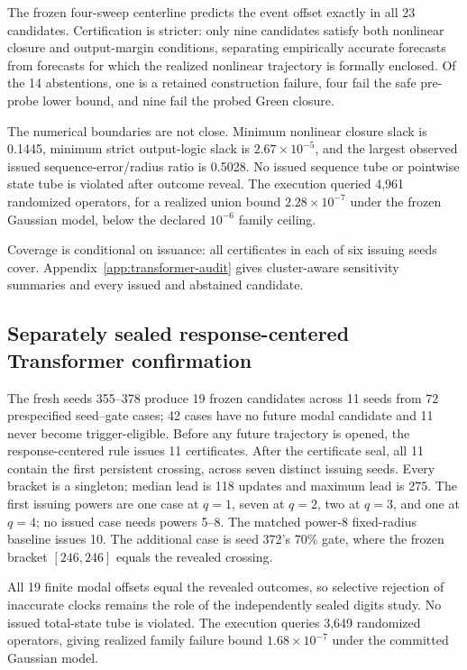 \documentclass{article}
\begin{document}
The frozen four-sweep centerline predicts the event offset exactly in all 23
candidates.  Certification is stricter: only nine candidates satisfy both
nonlinear closure and output-margin conditions, separating empirically
accurate forecasts from forecasts for which the realized nonlinear trajectory
is formally enclosed.  Of the 14 abstentions, one is a retained
construction failure, four fail the safe pre-probe lower bound, and nine fail
the probed Green closure.

The numerical boundaries are not close.  Minimum nonlinear closure slack is
0.1445, minimum strict output-logic slack is $2.67\times10^{-5}$, and the
largest observed issued sequence-error/radius ratio is 0.5028.  No issued
sequence tube or pointwise state tube is violated after outcome reveal.  The
execution queried 4,961 randomized operators, for a realized union bound
$2.28\times10^{-7}$ under the frozen Gaussian model, below the declared
$10^{-6}$ family ceiling.

Coverage is conditional on issuance: all certificates in each of six issuing
seeds cover.  Appendix~\ref{app:transformer-audit} gives cluster-aware
sensitivity summaries and every issued and abstained candidate.

\subsection{Separately sealed response-centered Transformer confirmation}

The fresh seeds 355--378 produce 19 frozen candidates across 11 seeds from 72
prespecified seed--gate cases; 42 cases have no future modal candidate and 11
never become trigger-eligible.  Before any future trajectory is opened, the
response-centered rule issues 11 certificates.  After the certificate seal,
all 11 contain the first persistent crossing, across seven distinct issuing
seeds.  Every bracket is a singleton; median lead is 118 updates and maximum
lead is 275.  The first issuing powers are one case at $q=1$, seven at $q=2$,
two at $q=3$, and one at $q=4$; no issued case needs powers 5--8.  The matched
power-8 fixed-radius baseline issues 10.  The additional case is seed 372's
70\% gate, where the frozen bracket $[246,246]$ equals the revealed crossing.

All 19 finite modal offsets equal the revealed outcomes, so selective
rejection of inaccurate clocks remains the role of the independently sealed
digits study.  No issued total-state tube is violated.  The execution queries
3,649 randomized operators, giving realized family failure bound
$1.68\times10^{-7}$ under the committed Gaussian model.
\end{document}
